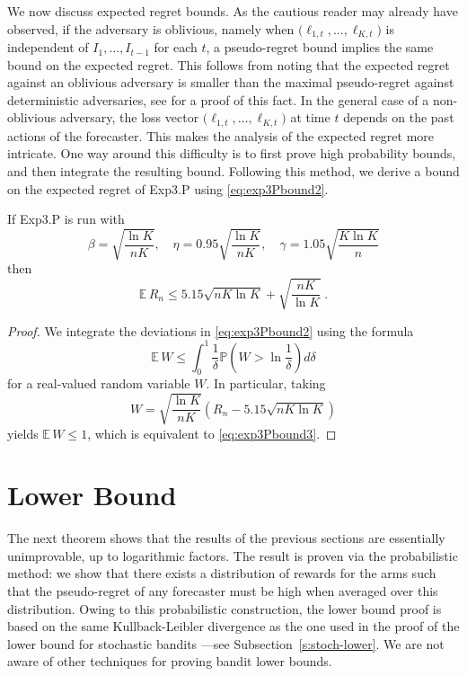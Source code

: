 \documentclass[11pt]{hackednow}
\renewcommand{\P}{\mathbb{P}}
\newcommand{\E}{\mathbb{E}}
\begin{document}
%
We now discuss expected regret bounds. As the cautious reader may already have observed, if the adversary is oblivious, namely when $\bigl(\ell_{1,t}, \hdots, \ell_{K,t}\bigr)$ is independent of $I_1, \hdots, I_{t-1}$ for each $t$, a pseudo-regret bound implies the same bound on the expected regret. This follows from noting that the expected regret against an oblivious adversary is smaller than the maximal pseudo-regret against deterministic adversaries, see \cite[Proposition 33]{AB10} for a proof of this fact. In the general case of a non-oblivious adversary, the loss vector $\bigl(\ell_{1,t}, \hdots, \ell_{K,t}\bigr)$ at time $t$ depends on the past actions of the forecaster. This makes the analysis of the expected regret more intricate. One way around this difficulty is to first prove high probability bounds, and then integrate the resulting bound. Following this method, we derive a bound on the expected regret of Exp3.P using \eqref{eq:exp3Pbound2}.
%
\begin{theorem}
If Exp3.P is run with
\[
    \beta = \sqrt{\frac{\ln K }{n K}}, \quad \eta = 0.95 \sqrt{\frac{\ln K }{n K}}, \quad \gamma = 1.05 \sqrt{\frac{K \ln K }{n}}
\]
then
\begin{equation} \label{eq:exp3Pbound3}
\E\,R_n \leq 5.15 \sqrt{n K \ln K} + \sqrt{\frac{n K}{\ln K }}~.
\end{equation}
\end{theorem}
%
\begin{proof}
We integrate the deviations in \eqref{eq:exp3Pbound2} using the formula
\[
    \E\,W \leq \int_{0}^1 \frac{1}{\delta} \P\left(W>\ln\frac{1}{\delta}\right) d\delta
\]
for a real-valued random variable $W$. In particular, taking
\[
    W=\sqrt{\frac{\ln K }{n K}} \left(R_n - 5.15 \sqrt{n K \ln K }\right)
\]
yields $\E\,W \leq 1$, which is equivalent to \eqref{eq:exp3Pbound3}.
\end{proof}

\section{Lower Bound} \label{sec:LB}
The next theorem shows that the results of the previous sections are essentially unimprovable, up to logarithmic factors. The result is proven via the probabilistic method: we show that there exists a distribution of rewards for the arms such that the pseudo-regret of any forecaster must be high when averaged over this distribution. Owing to this probabilistic construction, the lower bound proof is based on the same Kullback-Leibler divergence as the one used in the proof of the lower bound for stochastic bandits ---see Subsection~\ref{s:stoch-lower}. We are not aware of other techniques for proving bandit lower bounds.
\end{document}
